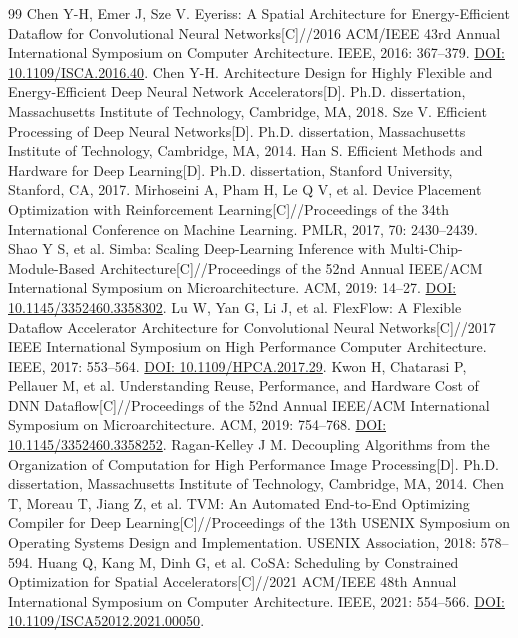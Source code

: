 \begin{thebibliography}{99}
 Chen Y-H, Emer J, Sze V. Eyeriss: A Spatial Architecture for Energy-Efficient Dataflow for Convolutional Neural Networks[C]//2016 ACM/IEEE 43rd Annual International Symposium on Computer Architecture. IEEE, 2016: 367--379. \href{https://doi.org/10.1109/ISCA.2016.40}{DOI: 10.1109/ISCA.2016.40}.
 Chen Y-H. Architecture Design for Highly Flexible and Energy-Efficient Deep Neural Network Accelerators[D]. Ph.D. dissertation, Massachusetts Institute of Technology, Cambridge, MA, 2018.
 Sze V. Efficient Processing of Deep Neural Networks[D]. Ph.D. dissertation, Massachusetts Institute of Technology, Cambridge, MA, 2014.
 Han S. Efficient Methods and Hardware for Deep Learning[D]. Ph.D. dissertation, Stanford University, Stanford, CA, 2017.
 Mirhoseini A, Pham H, Le Q V, et al. Device Placement Optimization with Reinforcement Learning[C]//Proceedings of the 34th International Conference on Machine Learning. PMLR, 2017, 70: 2430--2439.
 Shao Y S, et al. Simba: Scaling Deep-Learning Inference with Multi-Chip-Module-Based Architecture[C]//Proceedings of the 52nd Annual IEEE/ACM International Symposium on Microarchitecture. ACM, 2019: 14--27. \href{https://doi.org/10.1145/3352460.3358302}{DOI: 10.1145/3352460.3358302}.
 Lu W, Yan G, Li J, et al. FlexFlow: A Flexible Dataflow Accelerator Architecture for Convolutional Neural Networks[C]//2017 IEEE International Symposium on High Performance Computer Architecture. IEEE, 2017: 553--564. \href{https://doi.org/10.1109/HPCA.2017.29}{DOI: 10.1109/HPCA.2017.29}.
 Kwon H, Chatarasi P, Pellauer M, et al. Understanding Reuse, Performance, and Hardware Cost of DNN Dataflow[C]//Proceedings of the 52nd Annual IEEE/ACM International Symposium on Microarchitecture. ACM, 2019: 754--768. \href{https://doi.org/10.1145/3352460.3358252}{DOI: 10.1145/3352460.3358252}.
 Ragan-Kelley J M. Decoupling Algorithms from the Organization of Computation for High Performance Image Processing[D]. Ph.D. dissertation, Massachusetts Institute of Technology, Cambridge, MA, 2014.
 Chen T, Moreau T, Jiang Z, et al. TVM: An Automated End-to-End Optimizing Compiler for Deep Learning[C]//Proceedings of the 13th USENIX Symposium on Operating Systems Design and Implementation. USENIX Association, 2018: 578--594.
 Huang Q, Kang M, Dinh G, et al. CoSA: Scheduling by Constrained Optimization for Spatial Accelerators[C]//2021 ACM/IEEE 48th Annual International Symposium on Computer Architecture. IEEE, 2021: 554--566. \href{https://doi.org/10.1109/ISCA52012.2021.00050}{DOI: 10.1109/ISCA52012.2021.00050}.

\end{thebibliography}
